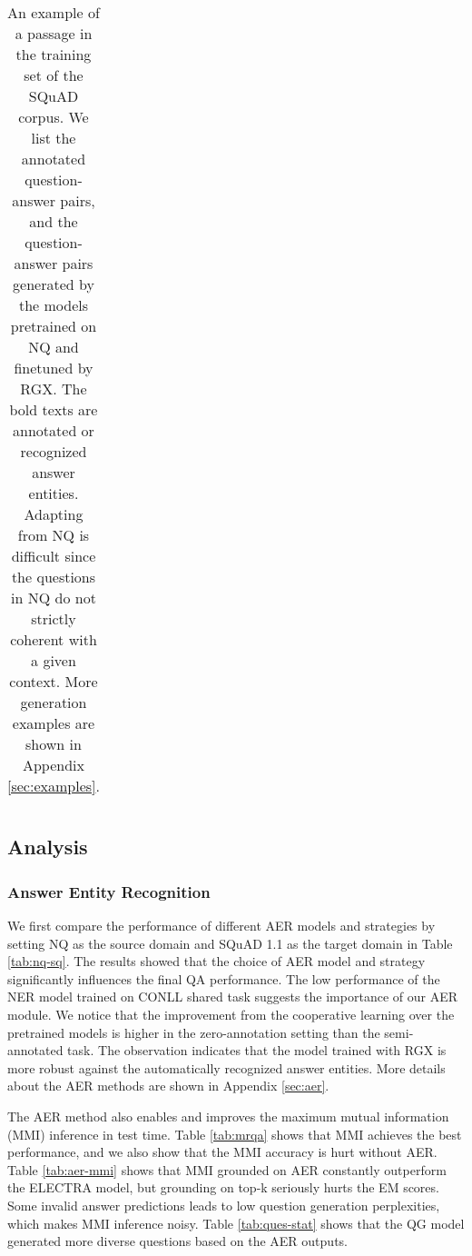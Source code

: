 \documentclass[11pt,a4paper]{article}
\begin{document}
\begin{table*}[t]
\begin{tabular}{@{}lcc@{}}
\end{tabular}
\caption{An example of a passage in the training set of the SQuAD corpus. We list the annotated question-answer pairs, and the question-answer pairs generated by the models pretrained on NQ and finetuned by RGX. The bold texts are annotated or recognized answer entities. Adapting from NQ is difficult since the questions in NQ do not strictly coherent with a given context. More generation examples are shown in Appendix \ref{sec:examples}.}
\label{tab:case-study}
\end{table*}

\subsection{Analysis}

\subsubsection{Answer Entity Recognition}
We first compare the performance of different AER models and strategies by setting NQ as the source domain and SQuAD 1.1 as the target domain in Table \ref{tab:nq-sq}. The results showed that the choice of AER model and strategy significantly influences the final QA performance. The low performance of the NER model trained on CONLL shared task suggests the importance of our AER module. We notice that the improvement from the cooperative learning over the pretrained models is higher in the zero-annotation setting than the semi-annotated task. The observation indicates that the model trained with RGX is more robust against the automatically recognized answer entities. More details about the AER methods are shown in Appendix \ref{sec:aer}.

The AER method also enables and improves the maximum mutual information (MMI) inference in test time. Table \ref{tab:mrqa} shows that MMI achieves the best performance, and we also show that the MMI accuracy is hurt without AER. Table \ref{tab:aer-mmi} shows that MMI grounded on AER constantly outperform the ELECTRA model, but grounding on top-k seriously hurts the EM scores. Some invalid answer predictions leads to low question generation perplexities, which makes MMI inference noisy. Table \ref{tab:ques-stat} shows that the QG model generated more diverse questions based on the AER outputs.
\end{document}
